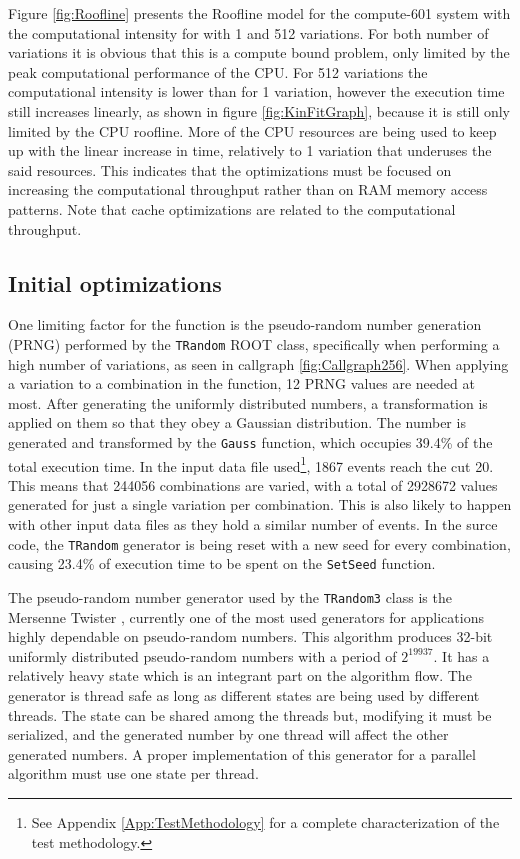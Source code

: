 Figure \ref{fig:Roofline} presents the Roofline model for the compute-601 system with the computational intensity for \ttDilepKinFit with 1 and 512 variations. For both number of variations it is obvious that this is a compute bound problem, only limited by the peak computational performance of the CPU. For 512 variations the computational intensity is lower than for 1 variation, however the \ttDilepKinFit execution time still increases linearly, as shown in figure \ref{fig:KinFitGraph}, because it is still only limited by the CPU roofline. More of the CPU resources are being used to keep up with the linear increase in time, relatively to 1 variation that underuses the said resources. This indicates that the optimizations must be focused on increasing the computational throughput rather than on RAM memory access patterns. Note that cache optimizations are related to the computational throughput.

\subsection{Initial optimizations}
\label{InitialOptimizations}

One limiting factor for the \ttDilepKinFit function is the pseudo-random number generation (PRNG) performed by the \texttt{TRandom} ROOT class, specifically when performing a high number of variations, as seen in callgraph \ref{fig:Callgraph256}. When applying a variation to a combination in the \ttDilepKinFit function, 12 PRNG values are needed at most. After generating the uniformly distributed numbers, a transformation is applied on them so that they obey a Gaussian distribution. The number is generated and transformed by the \texttt{Gauss} function, which occupies 39.4\% of the total execution time. In the input data file used\footnote{See Appendix \ref{App:TestMethodology} for a complete characterization of the test methodology.}, 1867 events reach the cut 20. This means that 244056 combinations are varied, with a total of 2928672 values generated for just a single variation per combination. This is also likely to happen with other input data files as they hold a similar number of events. In the \ttDilepKinFit surce code, the \texttt{TRandom} generator is being reset with a new seed for every combination, causing 23.4\% of execution time to be spent on the \texttt{SetSeed} function.

The pseudo-random number generator used by the \texttt{TRandom3} class is the Mersenne Twister \cite{MersenneTwister}, currently one of the most used generators for applications highly dependable on pseudo-random numbers. This algorithm produces 32-bit uniformly distributed pseudo-random numbers with a period of $2^{19937}$. It has a relatively heavy state which is an integrant part on the algorithm flow. The generator is thread safe as long as different states are being used by different threads. The state can be shared among the threads but, modifying it must be serialized, and the generated number by one thread will affect the other generated numbers. A proper implementation of this generator for a parallel algorithm must use one state per thread.

